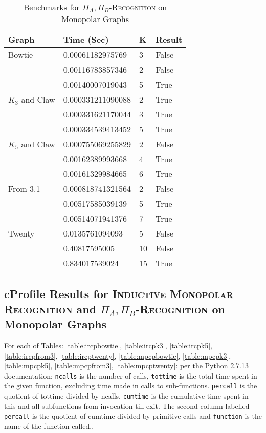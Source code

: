 \documentclass[11pt]{article}
\newcommand{\inlinecode}{\texttt}
\begin{document}
\begin{table}[ht]
\begin{center}
\begin{tabu} to 0.9\textwidth { | X[l] X[l] X[c] X[c] | }
\hline
Graph & Time (Sec) & K & Result \\
[0.5ex]
\hline
\hline
Bowtie & 0.00061182975769 & 3 & False \\
[0.3ex]
 & 0.00116783857346 & 2 & False \\
 [0.3ex]
 & 0.00140007019043 & 5 & True \\
 [0.3ex]
 \hline
$K_3$ and Claw & 0.000331211090088 & 2 & True \\
[0.3ex]
 & 0.000331621170044 & 3 & True \\
 [0.3ex]
 & 0.000334539413452 & 5 & True \\
 [0.3ex]
 \hline
$K_5$ and Claw & 0.000755069255829 & 2 & False \\
[0.3ex]
 & 0.00162389993668 & 4 & True \\
 [0.3ex]
 & 0.00161329984665 & 6 & True \\
 [0.3ex]
 \hline
From 3.1 & 0.000818741321564 & 2 & False \\
[0.3ex]
 & 0.00517585039139 & 5 & True \\
 [0.3ex]
 & 0.00514071941376 & 7 & True \\
 [0.3ex]
 \hline
Twenty & 0.0135761094093 & 5 & False \\
[0.3ex]
 & 0.40817595005 & 10 & False \\
 [0.3ex]
 & 0.834017539024 & 15 & True \\
 [0.3ex]
 \hline
\end{tabu}
\end{center}
\caption{Benchmarks for \textsc{$\Pi_A,\Pi_B$-Recognition} on Monopolar Graphs}
\label{table:mpresults}
\end{table}

\subsection{cProfile Results for \textsc{Inductive Monopolar Recognition} and \textsc{$\Pi_A,\Pi_B$-Recognition} on Monopolar Graphs}
\label{subsec:profiles}
For each of Tables: \ref{table:ircpbowtie}, \ref{table:ircpk3}, \ref{table:ircpk5}, \ref{table:ircpfrom3}, \ref{table:ircptwenty}, \ref{table:mpcpbowtie}, \ref{table:mpcpk3}, \ref{table:mpcpk5}, \ref{table:mpcpfrom3}, \ref{table:mpcptwenty}: per the Python 2.7.13 documentation: \inlinecode{ncalls} is the number of calls, \inlinecode{tottime} is the total time spent in the given function, excluding time made in calls to sub-functions. \inlinecode{percall} is the quotient of tottime divided by ncalls. \inlinecode{cumtime}
is the cumulative time spent in this and all subfunctions from invocation till exit.
The second column labelled \inlinecode{percall} is the quotient of cumtime divided by primitive calls and \inlinecode{function} is the name of the function called.\cite{ref3}.
\end{document}
